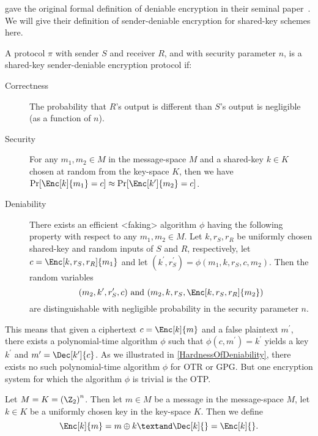 \citeauthor{DeniableEncryption} gave the original formal definition of deniable 
encryption in their seminal paper~\cite{DeniableEncryption}.
We will give their definition of sender-deniable encryption for shared-key 
schemes here.
\begin{definition}\label{DeniableEnc}
  A protocol \(\pi\) with sender \(S\) and receiver \(R\), and with security 
  parameter \(n\), is a shared-key sender-deniable encryption protocol if:
  \begin{description}
    \item[Correctness] The probability that \(R\)'s output is different than 
      \(S\)'s output is negligible (as a function of \(n\)).

    \item[Security] For any \(m_1, m_2\in M\) in the message-space \(M\) and 
      a shared-key \(k\in K\) chosen at random from the key-space \(K\), then 
      we have \(\Pr[ \Enc[k]{ m_1 } = c ] \approx \Pr[ \Enc[k^\prime]{ m_2 
        } = c ]\).

    \item[Deniability] There exists an efficient <faking> algorithm \(\phi\) 
      having the following property with respect to any \(m_1, m_2\in M\).
      Let \(k, r_S, r_R\) be uniformly chosen shared-key and random inputs of 
      \(S\) and \(R\), respectively, let \(c = \Enc[k, r_S, r_R]{ m_1 }\) and 
      let \((k^\prime, r_S^\prime) = \phi( m_1, k, r_S, c, m_2 )\).
      Then the random variables \[
        ( m_2, k^\prime, r_S^\prime, c ) \text{ and }
        ( m_2, k, r_S, \Enc[k, r_S, r_R]{ m_2 } )
      \] are distinguishable with negligible probability in the security 
      parameter \(n\).
  \end{description}
\end{definition}
This means that given a ciphertext \(c = \Enc[k]{ m }\) and a false plaintext 
\(m^\prime\), there exists a polynomial-time algorithm \(\phi\) such that 
\(\phi( c, m^\prime ) = k^\prime\) yields a key \(k^\prime\) and \(m^\prime 
  = \Dec[k^\prime]{ c }\).
As we illustrated in \cref{HardnessOfDeniability}, there exists no such 
polynomial-time algorithm \(\phi\) for \ac{OTR} or \ac{GPG}.
But one encryption system for which the algorithm \(\phi\) is trivial is the 
\ac{OTP}.

\begin{definition}\label{OTP}
  Let \(M = K = {(\Z_2)}^n\).
  Then let \(m\in M\) be a message in the message-space \(M\), let \(k\in K\) 
  be a uniformly chosen key in the key-space \(K\).
  Then we define \[
    \Enc[k]{ m } = m\oplus k \textand \Dec[k]{} = \Enc[k]{}.
  \]
\end{definition}


